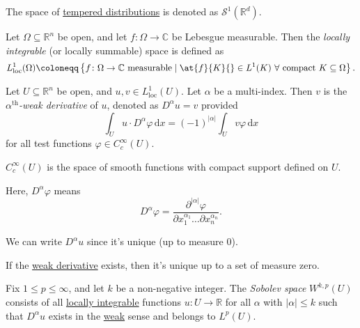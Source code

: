 \begin{notation}
	The space of \hyperref[def:tempered-distribution]{tempered distributions} is denoted as \(\mathcal{S} ^1(\mathbb{R} ^d)\).
\end{notation}

\begin{definition}\label{def:locally-integrable}
	Let \(\Omega \subseteq \mathbb{R} ^n\) be open, and let \(f\colon \Omega \to \mathbb{C} \) be Lebesgue measurable. Then the \emph{locally integrable} (or locally summable) space is defined as
	\[
		L^1_{\text{loc} }(\Omega ) \coloneqq \left\{ f\colon \Omega \to \mathbb{C} \text{ measurable} \mid \at{f}{K}{} \in L^1(K)\ \forall \text{ compact } K \subseteq \Omega \right\}.
	\]
\end{definition}

\begin{definition}\label{def:weak-derivative}
	Let \(U \subseteq \mathbb{R} ^n\) be open, and \(u, v\in L^1_{\text{loc} }(U)\). Let \(\alpha\) be a multi-index. Then \(v\) is the \emph{\(\alpha ^{\text{th}}\)-weak derivative} of \(u\), denoted as \(D^\alpha u = v\) provided
	\[
		\int _U u\cdot D^\alpha \varphi \,\mathrm{d} x = (-1)^{\vert \alpha \vert} \int _U v \varphi \,\mathrm{d} x
	\]
	for all test functions \(\varphi \in C^{\infty} _c(U)\).
\end{definition}

\begin{notation}
	\(C_c^{\infty} (U)\) is the space of smooth functions with compact support defined on \(U\).
\end{notation}

\begin{notation}
	Here, \(D^\alpha \varphi \) means
	\[
		D^\alpha \varphi = \frac{\partial ^{\vert \alpha  \vert }\varphi }{\partial x_1^{\alpha_1} \dots \partial x_n^{\alpha_n} }.
	\]
\end{notation}

\begin{note}
	We can write \(D^\alpha u\) since it's unique (up to measure \(0\)).
\end{note}

\begin{remark}
	If the \hyperref[def:weak-derivative]{weak derivative} exists, then it's unique up to a set of measure zero.
\end{remark}

\begin{definition}\label{def:Sobolev-space}
	Fix \(1 \leq p \leq \infty \), and let \(k\) be a non-negative integer. The \emph{Sobolev space} \(W^{k, p}(U)\) consists of all \hyperref[def:locally-integrable]{locally integrable} functions \(u\colon U \to \mathbb{R} \) for all \(\alpha \) with \(\vert \alpha \vert \leq k\) such that \(D^\alpha u\) exists in the \hyperref[def:weak-derivative]{weak} sense and belongs to \(L^p(U)\).
\end{definition}

